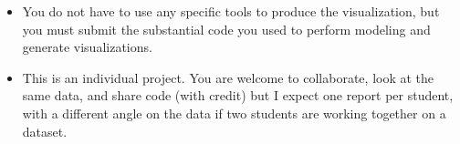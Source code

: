 \documentclass[]{book}
\theoremstyle{definition}
\newtheorem*{soln}{Solution}
\begin{document}
\begin{enumerate}
\begin{itemize}
\item You do not have to use any specific tools to produce the visualization, but you must submit the substantial code you used to perform modeling and generate visualizations.  

\item This is an individual project.  You are welcome to collaborate, look at the same data, and share code (with credit) but I expect one report per student, with a different angle on the data if two students are working together on a dataset.  

\end{itemize}













\end{enumerate}
\end{document}
